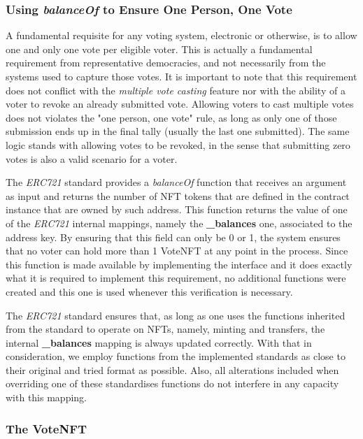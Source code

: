 \documentclass[../main.tex]{subfiles}
\begin{document}
\subsubsection{Using \textit{balanceOf} to Ensure One Person, One Vote}
A fundamental requisite for any voting system, electronic or otherwise, is to allow one and only one vote per eligible voter. This is actually a fundamental requirement from representative democracies, and not necessarily from the systems used to capture those votes. It is important to note that this requirement does not conflict with the \textit{multiple vote casting} feature nor with the ability of a voter to revoke an already submitted vote. Allowing voters to cast multiple votes does not violates the "one person, one vote" rule, as long as only one of those submission ends up in the final tally (usually the last one submitted). The same logic stands with allowing votes to be revoked, in the sense that submitting zero votes is also a valid scenario for a voter.
\par
The \textit{ERC721} standard provides a \textit{balanceOf} function that receives an argument as input and returns the number of NFT tokens that are defined in the contract instance that are owned by such address. This function returns the value of one of the \textit{ERC721} internal mappings, namely the \textbf{\_balances} one, associated to the address key. By ensuring that this field can only be 0 or 1, the system ensures that no voter can hold more than 1 VoteNFT at any point in the process. Since this function is made available by implementing the interface and it does exactly what it is required to implement this requirement, no additional functions were created and this one is used whenever this verification is necessary.
\par
The \textit{ERC721} standard ensures that, as long as one uses the functions inherited from the standard to operate on NFTs, namely, minting and transfers, the internal \textbf{\_balances} mapping is always updated correctly. With that in consideration, we employ functions from the implemented standards as close to their original and tried format as possible. Also, all alterations included when overriding one of these standardises functions do not interfere in any capacity with this mapping.

\subsubsection{The VoteNFT}
\end{document}
